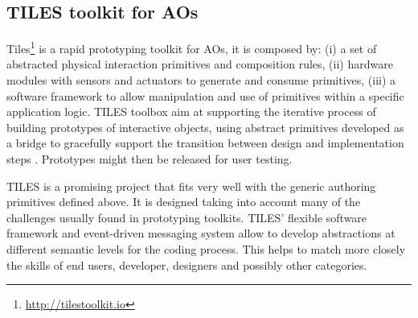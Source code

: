 \subsection{TILES toolkit for AOs}
Tiles\footnote{\url{http://tilestoolkit.io}} is a rapid prototyping toolkit for AOs, it is composed by: (i) a set of abstracted physical interaction primitives and composition rules, (ii) hardware modules with sensors and actuators to generate and consume primitives, (iii) a software framework to allow manipulation and use of primitives within a specific application logic. TILES toolbox aim at supporting the iterative process of building prototypes of interactive objects, using abstract primitives developed as a bridge to gracefully support the transition between design and implementation steps \cite{mora_tiles_2016}. Prototypes might then be released for user testing.

TILES is a promising project that fits very well with the generic authoring primitives defined above. It is designed taking into account many of the challenges usually found in prototyping toolkits.
TILES' flexible software framework and event-driven messaging system allow to develop abstractions at different semantic levels for the coding process. This helps to match more closely the skills of end users, developer, designers and possibly other categories.